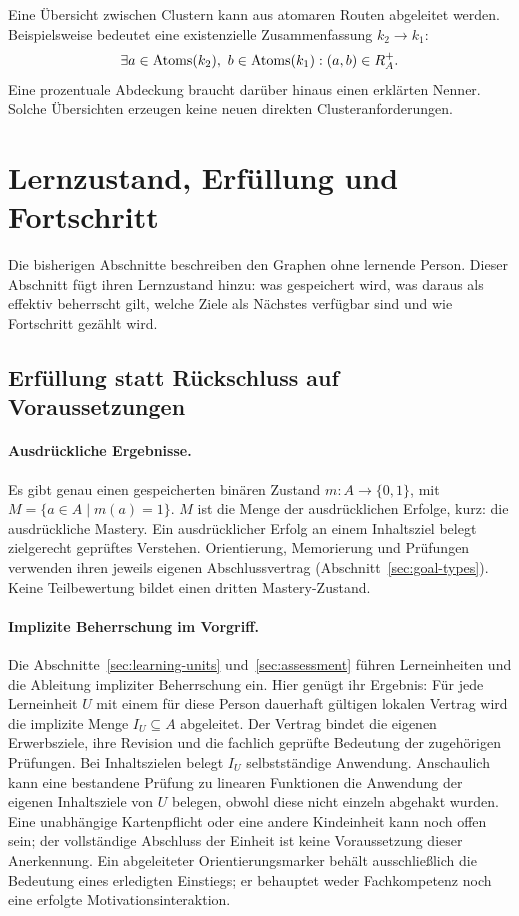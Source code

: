 Eine Übersicht zwischen Clustern kann aus atomaren Routen abgeleitet werden.
Beispielsweise bedeutet eine existenzielle Zusammenfassung $k_2\to k_1$:
\[
 \exists a\in\Atoms(k_2),\ b\in\Atoms(k_1):(a,b)\in R_A^+.
\]
Eine prozentuale Abdeckung braucht darüber hinaus einen erklärten Nenner.
Solche Übersichten erzeugen keine neuen direkten Clusteranforderungen.

\FloatBarrier
\section{Lernzustand, Erfüllung und Fortschritt}
\label{sec:state}
Die bisherigen Abschnitte beschreiben den Graphen ohne lernende Person.
Dieser Abschnitt fügt ihren Lernzustand hinzu: was gespeichert wird, was
daraus als effektiv beherrscht gilt, welche Ziele als Nächstes verfügbar
sind und wie Fortschritt gezählt wird.

\subsection{Erfüllung statt Rückschluss auf Voraussetzungen}
\paragraph{Ausdrückliche Ergebnisse.}
Es gibt genau einen gespeicherten binären Zustand $m:A\to\{0,1\}$,
mit $M=\{a\in A\mid m(a)=1\}$. $M$ ist die Menge der ausdrücklichen Erfolge,
kurz: die ausdrückliche Mastery. Ein ausdrücklicher Erfolg an einem
Inhaltsziel belegt zielgerecht geprüftes Verstehen. Orientierung,
Memorierung und Prüfungen verwenden ihren jeweils eigenen Abschlussvertrag
(Abschnitt~\ref{sec:goal-types}). Keine Teilbewertung
bildet einen dritten Mastery-Zustand.

\paragraph{Implizite Beherrschung im Vorgriff.}
Die Abschnitte~\ref{sec:learning-units} und~\ref{sec:assessment} führen
Lerneinheiten und die Ableitung impliziter Beherrschung ein. Hier genügt
ihr Ergebnis:
Für jede Lerneinheit $U$ mit einem für diese Person dauerhaft
gültigen lokalen Vertrag wird die implizite Menge $I_U\subseteq A$ abgeleitet.
Der Vertrag bindet die eigenen Erwerbsziele, ihre Revision und die fachlich
geprüfte Bedeutung der zugehörigen Prüfungen.
Bei Inhaltszielen belegt $I_U$ selbstständige Anwendung.
Anschaulich kann eine bestandene Prüfung zu linearen Funktionen die
Anwendung der eigenen Inhaltsziele von $U$ belegen, obwohl diese
nicht einzeln abgehakt wurden. Eine unabhängige Kartenpflicht oder eine
andere Kindeinheit kann noch offen sein; der vollständige Abschluss der
Einheit ist keine Voraussetzung dieser Anerkennung. Ein abgeleiteter
Orientierungsmarker behält ausschließlich die Bedeutung eines erledigten
Einstiegs; er behauptet weder Fachkompetenz noch eine erfolgte
Motivationsinteraktion.

